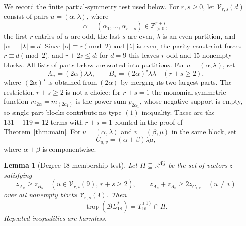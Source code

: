 \documentclass[11pt]{amsart}
\newtheorem{lemma}[theorem]{Lemma}
\DeclareMathOperator{\trop}{trop}
\newcommand{\BS}{\mathcal{B}\Sigma}
\newcommand{\EPart}{\Lambda^{\mathrm{ev}}}
\newcommand{\R}{\mathbb{R}}
\begin{document}
We record the finite partial-symmetry test used below. For
\(r,s\ge0\), let \(\mathcal V_{r,s}(d)\) consist of pairs
\(u=(\alpha,\lambda)\), where
\[
\alpha=(\alpha_1,\ldots,\alpha_{r+s})
\in\mathbb Z_{>0}^{r+s},
\]
the first \(r\) entries of \(\alpha\) are odd, the last \(s\) are
even, \(\lambda\) is an even partition, and
\(
|\alpha|+|\lambda|=d
\).
Since \(|\alpha|\equiv r\pmod 2\) and \(|\lambda|\) is even, the parity
constraint forces \(r\equiv d\pmod2\), and \(r+2s\le d\); for \(d=9\)
this leaves \(r\) odd and \(15\) nonempty blocks. All lists of parts
below are sorted into partitions. For \(u=(\alpha,\lambda)\), set
\[
A_u=(2\alpha)\lambda\lambda,
\qquad
B_u=(2\alpha)^{\star}\lambda\lambda
\quad (r+s\ge2),
\]
where \((2\alpha)^{\star}\) is obtained from \((2\alpha)\) by
merging its two largest parts. The restriction \(r+s\ge2\) is not a
choice: for \(r+s=1\) the monomial symmetric function
\(m_{2\alpha}=m_{(2\alpha_1)}\) is the power sum \(p_{2\alpha_1}\),
whose negative support is empty, so single-part blocks contribute no
type-\((1)\) inequality. These are the \(131-119=12\) terms with
\(r+s=1\) counted in the proof of Theorem~\ref{thm:main}. For
\(u=(\alpha,\lambda)\) and \(v=(\beta,\mu)\) in the same block, set
\[
C_{u,v}=(\alpha+\beta)\lambda\mu,
\]
where \(\alpha+\beta\) is componentwise.

\begin{lemma}[Degree-18 membership test]\label{lem:test}
Let \(H\subseteq\R^{\EPart_{18}}\) be the set of vectors \(z\)
satisfying
\begin{equation}\label{eq:H}
 z_{A_u}\ge z_{B_u}
 \quad (u\in\mathcal V_{r,s}(9),\ r+s\ge2),
 \qquad
 z_{A_u}+z_{A_v}\ge2z_{C_{u,v}}
 \quad (u\ne v)
\end{equation}
over all nonempty blocks \(\mathcal V_{r,s}(9)\). Then
\[
\trop(\BS_{18}^{*})=T_{18}^{(1)}\cap H.
\]
Repeated inequalities are harmless.
\end{lemma}
\end{document}
